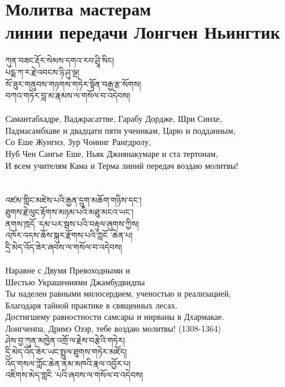 \section{Молитва мастерам \\линии передачи Лонгчен Ньингтик}
\vspace{1cm}
\ti
ཀུན་བཟང་རྡོར་སེམས་དགའ་རབ་ཤྲཱི་སིང།\\
པདྨ་ཀ་ར་རྗེ་འབངས་ཉི་ཤུ་ལྔ།\\
སོ་ཟུར་གནུབས་གཉགས་གཏེར་སྟོན་བརྒྱ་རྩ་སོགས།\\
བཀའ་གཏེར་བླ་མ་རྣམས་ལ་གསོལ་བ་འདེབས།\\
\\
\ru
Самантабхадре, Ваджрасаттве, Гарабу Дордже, Шри Синхе,\\
Падмасамбхаве и двадцати пяти ученикам, Царю и подданным,\\
Со Еше Жунгнэ, Зур Чоиннг Рангдролу,\\
Нуб Чен Сангье Еше, Ньяк Джнянакумаре и ста тертонам,\\
И всем учителям Кама и Терма линий передач воздаю молитвы!\\
\\
\\
\ti
འཛམ་གླིང་མཛེས་པའི་རྒྱན་དྲུག་མཆོག་གཉིས་དང་། \\
ཐུགས་རྗེ་ལུང་རྟོགས་མཉམ་པའི་མཐུ་མངའ་ཡང་། \\
ནགས་ཁྲདོ ་དམ་པར་སྦས་པའི་བརྟུལ་ཞུགས་ཀྱིས། \\
འཁོར་འདས་ཆོས་སྐུར་རྫོགས་པའི་ཀླངོ ་ཆེན་པ། \\
དྲི་མེད་འོད་ཟེར་ཞབས་ལ་གསོལ་བ་འདེབས།\\
\\
\ru
Наравне с Двумя Превоходными и \\
Шестью Украшениями Джамбудвидпы\\
Ты наделен равными милосердием, ученостью и реализацией,\\
Благодаря тайной практике в священных лесах.\\
Достигшему равностности самсары и нирваны в Дхармакае.\\
Лонгченпа, Дримэ Озэр, тебе воздаю молитвы! (1308-1364)
\\
\newpage
\ti
ཤེས་བྱ་ཀུན་མཁྱེན་འགྲོ་ལ་རྗེས་བརྩེའི་གཏེར། \\
དྲི་མེད་འོད་ཟེར་ཡང་སྤྲུལ་ཐུགས་གཏེར་མཛོད། \\
འོད་གསལ་ཀློང་ཆེན་ནམ་མཁའི་རྣལ་འབྱོར་པ། \\
འཇིགས་མེད་གླངི ་པའི་ཞབས་ལ་གསོལ་བ་འདེབས།\\
\\
